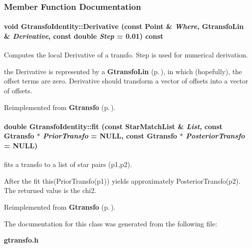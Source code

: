 \subsubsection{Member Function Documentation}
\paragraph{\setlength{\rightskip}{0pt plus 5cm}void Gtransfo\-Identity::Derivative (const {\bf Point} \& {\em Where}, {\bf Gtransfo\-Lin} \& {\em Derivative}, const double {\em Step} = 0.01) const\hspace{0.3cm}{\tt  [virtual]}}\hfill\label{class_gtransfoidentity_a7}


Computes the local Derivative of a transfo. Step is used for numerical derivation.

the Derivative is represented by a {\bf Gtransfo\-Lin} {\rm (p.\,\pageref{class_gtransfolin})}, in which (hopefully), the offset terms are zero. Derivative should  transform a vector of offsets into a vector of offsets. 

Reimplemented from {\bf Gtransfo} {\rm (p.\,\pageref{class_gtransfo_a9})}.
\paragraph{\setlength{\rightskip}{0pt plus 5cm}double Gtransfo\-Identity::fit (const Star\-Match\-List \& {\em List}, const {\bf Gtransfo} $\ast$ {\em Prior\-Transfo} = NULL, const {\bf Gtransfo} $\ast$ {\em Posterior\-Transfo} = NULL)\hspace{0.3cm}{\tt  [inline, virtual]}}\hfill\label{class_gtransfoidentity_a2}


fits a transfo to a list of star pairs (p1,p2).

After the fit this(Prior\-Transfo(p1)) yields approximately Posterior\-Transfo(p2). The returned value is the chi2. 

Reimplemented from {\bf Gtransfo} {\rm (p.\,\pageref{class_gtransfo_a4})}.

The documentation for this class was generated from the following file:\begin{CompactItemize}
\item 
{\bf gtransfo.h}\end{CompactItemize}
